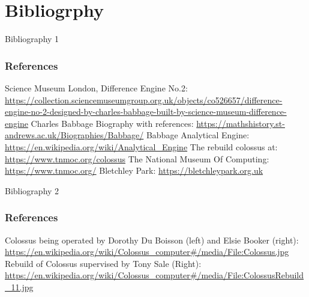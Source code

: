 \documentclass{beamer}
\begin{document}
\section{Bibliogrphy}

\begin{frame}{Bibliography 1}
  \frametitle{References}
  
  \begin{thebibliography}{Babbage Difference Engine}
    Science Museum London, Difference Engine No.2: {\url{https://collection.sciencemuseumgroup.org.uk/objects/co526657/difference-engine-no-2-designed-by-charles-babbage-built-by-science-museum-difference-engine}}
    Charles Babbage Biography with references: {\url{https://mathshistory.st-andrews.ac.uk/Biographies/Babbage/}}
    Babbage Analytical Engine: {\url{https://en.wikipedia.org/wiki/Analytical_Engine}}
    The rebuild colossus at: {\url{https://www.tnmoc.org/colossus}}
    The National Museum Of Computing: {\url{https://www.tnmoc.org/}}
    Bletchley Park: {\url{https://bletchleypark.org.uk}}
  \end{thebibliography}
\end{frame}

\begin{frame}{Bibliography 2}
  \frametitle{References}
  
  \begin{thebibliography}{ColossusRebuild}
    Colossus being operated by Dorothy Du Boisson (left) and Elsie Booker (right): {\url{https://en.wikipedia.org/wiki/Colossus_computer#/media/File:Colossus.jpg}}
    Rebuild of Colossus supervised by Tony Sale (Right): {\url{https://en.wikipedia.org/wiki/Colossus_computer#/media/File:ColossusRebuild_11.jpg}}
  \end{thebibliography}
\end{frame}
\end{document}
